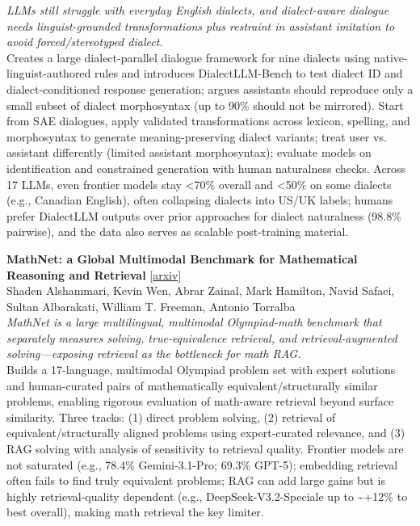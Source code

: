 \documentclass[12pt,letterpaper]{article}
\begin{document}
{\small\textit{LLMs still struggle with everyday English dialects, and dialect-aware dialogue needs linguist-grounded transformations plus restraint in assistant imitation to avoid forced/stereotyped dialect.}}\\[1pt]
{\footnotesize Creates a large dialect-parallel dialogue framework for nine dialects using native-linguist-authored rules and introduces DialectLLM-Bench to test dialect ID and dialect-conditioned response generation; argues assistants should reproduce only a small subset of dialect morphosyntax (up to 90\% should not be mirrored). Start from SAE dialogues, apply validated transformations across lexicon, spelling, and morphosyntax to generate meaning-preserving dialect variants; treat user vs. assistant differently (limited assistant morphosyntax); evaluate models on identification and constrained generation with human naturalness checks. Across 17 LLMs, even frontier models stay <70\% overall and <50\% on some dialects (e.g., Canadian English), often collapsing dialects into US/UK labels; humans prefer DialectLLM outputs over prior approaches for dialect naturalness (98.8\% pairwise), and the data also serves as scalable post-training material.}

\medskip

{\small\textbf{MathNet: a Global Multimodal Benchmark for Mathematical Reasoning and Retrieval}} {\scriptsize[\href{https://arxiv.org/abs/2604.18584}{arxiv}]}\\
{\scriptsize Shaden Alshammari, Kevin Wen, Abrar Zainal, Mark Hamilton, Navid Safaei, Sultan Albarakati, William T. Freeman, Antonio Torralba}\\

{\small\textit{MathNet is a large multilingual, multimodal Olympiad-math benchmark that separately measures solving, true-equivalence retrieval, and retrieval-augmented solving---exposing retrieval as the bottleneck for math RAG.}}\\[1pt]
{\footnotesize Builds a 17-language, multimodal Olympiad problem set with expert solutions and human-curated pairs of mathematically equivalent/structurally similar problems, enabling rigorous evaluation of math-aware retrieval beyond surface similarity. Three tracks: (1) direct problem solving, (2) retrieval of equivalent/structurally aligned problems using expert-curated relevance, and (3) RAG solving with analysis of sensitivity to retrieval quality. Frontier models are not saturated (e.g., 78.4\% Gemini-3.1-Pro; 69.3\% GPT-5); embedding retrieval often fails to find truly equivalent problems; RAG can add large gains but is highly retrieval-quality dependent (e.g., DeepSeek-V3.2-Speciale up to \textasciitilde{}+12\% to best overall), making math retrieval the key limiter.}
\end{document}
